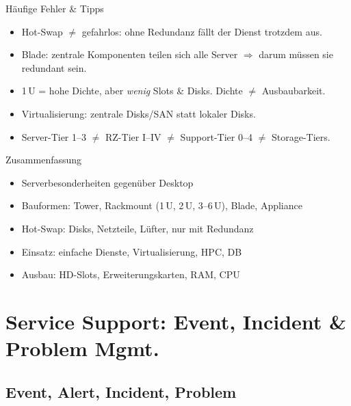 \documentclass[a4paper, fontsize=7pt]{scrartcl}
\begin{document}
\begin{subbox}{Häufige Fehler \& Tipps}
\begin{itemize}
    \item Hot-Swap $\neq$ gefahrlos: ohne Redundanz fällt der Dienst trotzdem aus.
    \item Blade: zentrale Komponenten teilen sich alle Server $\Rightarrow$ darum
          müssen sie redundant sein.
    \item 1\,U = hohe Dichte, aber \emph{wenig} Slots \& Disks. Dichte $\neq$
          Ausbaubarkeit.
    \item Virtualisierung: zentrale Disks/SAN statt lokaler Disks.
    \item Server-Tier 1--3 $\neq$ RZ-Tier I--IV $\neq$ Support-Tier 0--4
          $\neq$ Storage-Tiers.
\end{itemize}
\end{subbox}

\begin{subbox}{Zusammenfassung}
\begin{itemize}
    \item Serverbesonderheiten gegenüber Desktop
    \item Bauformen: Tower, Rackmount (1\,U, 2\,U, 3--6\,U), Blade, Appliance
    \item Hot-Swap: Disks, Netzteile, Lüfter, nur mit Redundanz
    \item Einsatz: einfache Dienste, Virtualisierung, HPC, DB
    \item Ausbau: HD-Slots, Erweiterungskarten, RAM, CPU
\end{itemize}
\end{subbox}

\section{Service Support: Event, Incident \& Problem Mgmt.}

\subsection{Event, Alert, Incident, Problem}
\end{document}
